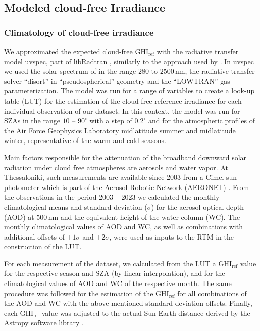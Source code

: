 \documentclass[preprint, 5p,
authoryear]{elsarticle} %
\begin{document}
\hypertarget{rtmcs}{%
\subsection{Modeled cloud-free Irradiance}\label{rtmcs}}

\hypertarget{climatology-of-cloud-free-irradiance}{%
\subsubsection{Climatology of cloud-free
irradiance}\label{climatology-of-cloud-free-irradiance}}

We approximated the expected cloud-free \(\text{GHI}_\text{ref}\) with
the radiative transfer model uvspec, part of libRadtran
\citep{Emde2016}, similarly to the approach used by
\citet{Vamvakas2020}. In uvspec we used the solar spectrum of
\citet{Kurucz1994} in the range \(280\) to \(2500\,\text{nm}\), the
radiative transfer solver ``disort'' in ``pseudospherical'' geometry and
the ``LOWTRAN'' gas parameterization. The model was run for a range of
variables to create a look-up table (LUT) for the estimation of the
cloud-free reference irradiance for each individual observation of our
dataset. In this context, the model was run for SZAs in the range \(10\)
-- \(90^\circ\) with a step of \(0.2^\circ\) and for the atmospheric
profiles of the Air Force Geophysics Laboratory \citep{Anderson1986}
midlatitude summer and midlatitude winter, representative of the warm
and cold seasons.

Main factors responsible for the attenuation of the broadband downward
solar radiation under cloud free atmospheres are aerosols and water
vapor. At Thessaloniki, such measurements are available since 2003 from
a Cimel sun photometer which is part of the Aerosol Robotic Network
(AERONET) \citep{Giles2019, Buis1998}. From the observations in the
period 2003 -- 2023 we calculated the monthly climatological means and
standard deviation (\(\sigma\)) for the aerosol optical depth (AOD) at
\(500\,\text{nm}\) and the equivalent height of the water column (WC).
The monthly climatological values of AOD and WC, as well as combinations
with additional offsets of \(\pm1\sigma\) and \(\pm2\sigma\), were used
as inputs to the RTM in the construction of the LUT.

For each measurement of the dataset, we calculated from the LUT a
\(\text{GHI}_\text{ref}\) value for the respective season and SZA (by
linear interpolation), and for the climatological values of AOD and WC
of the respective month. The same procedure was followed for the
estimation of the \(\text{GHI}_\text{ref}\) for all combinations of the
AOD and WC with the above-mentioned standard deviation offsets. Finally,
each \(\text{GHI}_\text{ref}\) value was adjusted to the actual
Sun-Earth distance derived by the Astropy software library
\citep{AstropyCollaboration2022}.
\end{document}
